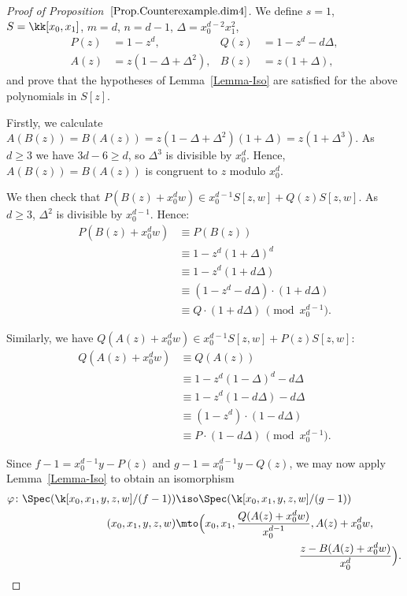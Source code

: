 \begin{proof}[Proof of Proposition~$\ref{Prop.Counterexample.dim4}$]
We define $s=1$, $S=\kk[x_0,x_1]$, $m=d$, $n=d-1$, $\Delta=x_0^{d-2}x_1^2$,
\begin{align*}
P(z) &=1-z^{d}, & Q(z) &=1-z^{d}-d\Delta,\\
A(z) &=z(1-\Delta+\Delta^2), & B(z) &=z(1+\Delta),
\end{align*}
and prove that the hypotheses of Lemma~\ref{Lemma-Iso} are satisfied for the above polynomials in $S[z]$.

Firstly, we calculate $A(B(z))=B(A(z))=z(1-\Delta+\Delta^2)(1+\Delta)=z(1+\Delta^3)$.
As $d \geq 3$ we have $3d-6\ge d$, so $\Delta^3$ is divisible by $x_0^d$.
Hence, $A(B(z))=B(A(z))$ is congruent to $z$ modulo $x_0^d$.

We then check that $P(B(z)+x_0^{d}w)\in x_0^{d-1}S[z,w]+Q(z)S[z,w]$. As $d\ge 3$, $\Delta^2$ is divisible by $x_0^{d-1}$. Hence:
\begin{align*}
P(B(z)+x_0^{d}w) &\equiv P(B(z))\\
&\equiv 1-z^d(1+\Delta)^{d} \\
&\equiv 1- z^d(1+d\Delta) \\
&\equiv(1-z^{d}-d\Delta)\cdot (1+d\Delta)\\
&\equiv Q\cdot (1+d\Delta)\, \pmod{x_0^{d-1}}.
\end{align*}

Similarly, we have
$Q(A(z)+x_0^{d}w)\in x_0^{d-1}S[z,w]+P(z)S[z,w]$:
\begin{align*}
Q(A(z)+x_0^{d}w) &\equiv Q(A(z))\\
& \equiv 1-z^d(1-\Delta)^d-d\Delta\\
& \equiv 1-z^d(1-d\Delta)-d\Delta\\
& \equiv (1-z^{d})\cdot (1-d\Delta)\\
&\equiv P\cdot (1-d\Delta)\, \pmod{x_0^{d-1}}.
\end{align*}

Since $f-1=x_0^{d-1}y-P(z)$ and $g-1=x_0^{d-1}y-Q(z)$, we may now apply Lemma~\ref{Lemma-Iso} to obtain an isomorphism
\begin{align*}
\varphi\colon\Spec(\k[x_0,x_1,y,z,w]/(f-1)) & \iso \Spec(\k[x_0,x_1,y,z,w]/(g-1)) \\
(x_0,x_1,y,z,w) & \mto \Bigl(x_0,x_1,\frac{Q(A(z)+x_0^{d}w)}{x_0^{d-1}},A(z)+x_0^{d}w, \\
&\hspace*{4cm}\frac{z-B(A(z)+x_0^{d}w)}{x_0^{d}}\Bigr).
\end{align*}


\end{proof}

